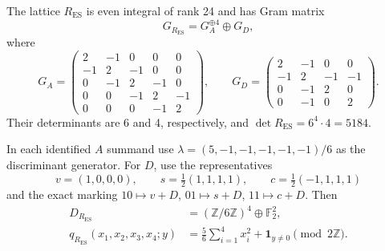 \begin{theorem}
\label{esn:thm:root-discriminant}
The lattice \(R_{\mathrm{ES}}\) is even integral of rank 24 and has
Gram matrix
\[
 G_{R_{\mathrm{ES}}}=G_A^{\oplus4}\oplus G_D,
\]
where
\[
 G_A=\begin{pmatrix}
 2&-1&0&0&0\\-1&2&-1&0&0\\0&-1&2&-1&0\\
 0&0&-1&2&-1\\0&0&0&-1&2
 \end{pmatrix},\qquad
 G_D=\begin{pmatrix}
 2&-1&0&0\\-1&2&-1&-1\\0&-1&2&0\\0&-1&0&2
 \end{pmatrix}.
\]
Their determinants are 6 and 4, respectively, and
\(\det R_{\mathrm{ES}}=6^4\cdot4=5184\).

In each identified \(A\) summand use
\(\lambda=(5,-1,-1,-1,-1,-1)/6\) as the discriminant generator.
For \(D\), use the representatives
\begin{equation}
 v=(1,0,0,0),\qquad s=\tfrac12(1,1,1,1),\qquad
 c=\tfrac12(-1,1,1,1)
 \label{esn:eq:d4-representatives}
\end{equation}
and the exact marking \(10\mapsto v+D\), \(01\mapsto s+D\),
\(11\mapsto c+D\).  Then
\begin{equation}
 \begin{split}
 D_{R_{\mathrm{ES}}}&=(\mathbb Z/6\mathbb Z)^4\oplus\mathbb F_2^2,\\
 q_{R_{\mathrm{ES}}}(x_1,x_2,x_3,x_4;y)
   &=\frac56\sum_{i=1}^4x_i^2+\mathbf1_{y\ne0}
                                              \pmod {2\mathbb Z}.
 \end{split}
 \label{esn:eq:full-discriminant}
\end{equation}
\end{theorem}

